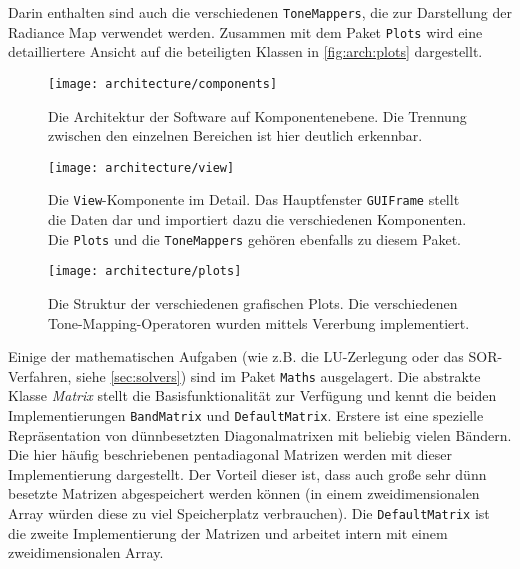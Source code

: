Darin enthalten sind auch die verschiedenen \texttt{ToneMappers}, die zur Darstellung der \gls{Radiance Map} verwendet werden. Zusammen mit dem Paket \texttt{Plots} wird eine detailliertere Ansicht auf die beteiligten Klassen in \autoref{fig:arch:plots} dargestellt.

\begin{figure}
  \begin{center}
    \texttt{[image: architecture/components]}
    \caption{Die Architektur der Software auf Komponentenebene. Die Trennung zwischen den einzelnen Bereichen ist hier deutlich erkennbar.}
    \label{fig:arch:components}
  \end{center}
\end{figure}


\begin{figure}
  \begin{center}
    \texttt{[image: architecture/view]}
    \caption{Die \texttt{View}-Komponente im Detail. Das Hauptfenster \texttt{GUIFrame} stellt die Daten dar und importiert dazu die verschiedenen Komponenten. Die \texttt{Plots} und die \texttt{ToneMappers} gehören ebenfalls zu diesem Paket.}
    \label{fig:arch:view}
  \end{center}
\end{figure}


\begin{figure}
  \begin{center}
    \texttt{[image: architecture/plots]}
    \caption{Die Struktur der verschiedenen grafischen Plots. Die verschiedenen \gls{Tone-Mapping}-Operatoren wurden mittels Vererbung implementiert.}
    \label{fig:arch:plots}
  \end{center}
\end{figure}

Einige der mathematischen Aufgaben (wie z.B. die LU-Zerlegung oder das SOR-Verfahren, siehe \autoref{sec:solvers}) sind im Paket \texttt{Maths} ausgelagert. Die abstrakte Klasse \textit{Matrix} stellt die Basisfunktionalität zur Verfügung und kennt die beiden Implementierungen \texttt{BandMatrix} und \texttt{DefaultMatrix}. Erstere ist eine spezielle Repräsentation von dünnbesetzten Diagonalmatrixen mit beliebig vielen Bändern. Die hier häufig beschriebenen pentadiagonal Matrizen werden mit dieser Implementierung dargestellt. Der Vorteil dieser ist, dass auch große sehr dünn besetzte Matrizen abgespeichert werden können (in einem zweidimensionalen Array würden diese zu viel Speicherplatz verbrauchen). Die \texttt{DefaultMatrix} ist die zweite Implementierung der Matrizen und arbeitet intern mit einem zweidimensionalen Array.

